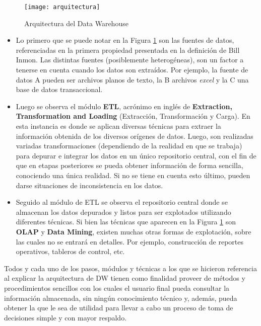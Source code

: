 \documentclass[a4paper,11pt]{article}
\begin{document}
    \begin{figure}
      \begin{center}
        \texttt{[image: arquitectura]}
        \caption{Arquitectura del Data Warehouse}
        \label{dw_arq}
      \end{center}
    \end{figure}
   
    \begin{itemize}
      \item Lo primero que se puede notar en la Figura \ref{dw_arq} son las fuentes de datos, referenciadas en la primera propiedad presentada en la
      definición de Bill Inmon. Las distintas fuentes (posiblemente heterogéneas), son un factor a tenerse en cuenta cuando los
      datos son extraídos. Por ejemplo, la fuente de datos A pueden ser archivos planos de texto, la B archivos \textit{excel} y la C una base de datos 
      transaccional.
    
      \item Luego se observa el módulo \textbf{ETL}, acrónimo en inglés de \textbf{Extraction, Transformation and Loading} (Extracción, Transformación y Carga).
      En esta instancia es donde se aplican diversas técnicas para extraer la información obtenida de
      los diversos orígenes de datos. Luego, son realizadas variadas transformaciones (dependiendo de la realidad en que se
      trabaja) para depurar e integrar los datos en un único repositorio central, con el fin de que en etapas posteriores se pueda obtener
      información de forma sencilla, conociendo una única realidad. Si no se tiene en cuenta esto último, pueden darse situaciones de
      inconsistencia en los datos.
    
      \item Seguido al módulo de ETL se observa el repositorio central donde se almacenan los datos depurados y listos para ser explotados utilizando
      diferentes técnicas. Si bien las técnicas que aparecen en la Figura \ref{dw_arq} son \textbf{OLAP} y \textbf{Data Mining}, existen muchas otras formas de 
      explotación, sobre las cuales no se entrará en detalles. Por ejemplo, construcción de reportes operativos, tableros de control, etc.
    \end{itemize}

    Todos y cada uno de los pasos, módulos y técnicas a los que se hicieron referencia al explicar la arquitectura de DW tienen como finalidad
    proveer de métodos y procedimientos sencillos con los cuales el usuario final pueda consultar la información almacenada, sin ningún conocimiento técnico y,
    además, pueda obtener la que le sea de utilidad para llevar a cabo un proceso de toma de decisiones simple y con mayor respaldo.
    
\end{document}
